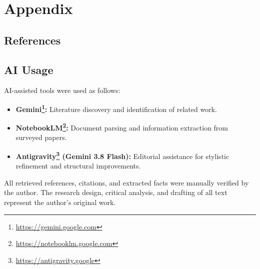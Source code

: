 \section{Appendix}
\label{sec:appendix}

\subsection{References}

\printbibliography[heading=none]

\subsection{AI Usage}

AI-assisted tools were used as follows:

\begin{itemize}
    \item \textbf{Gemini\footnote{\url{https://gemini.google.com}}:} Literature discovery and identification of related work.
    \item \textbf{NotebookLM\footnote{\url{https://notebooklm.google.com}}:} Document parsing and information extraction from surveyed papers.
    \item \textbf{Antigravity\footnote{\url{https://antigravity.google}} (Gemini 3.8 Flash):} Editorial assistance for stylistic refinement and structural improvements.
\end{itemize}

All retrieved references, citations, and extracted facts were manually verified by the author. The research design, critical analysis, and drafting of all text represent the author's original work.
